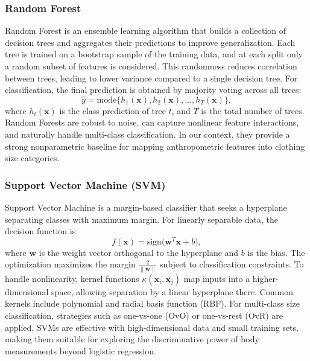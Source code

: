 \documentclass{llncs}
\begin{document}
\subsubsection{Random Forest}
Random Forest \cite{ref18} is an ensemble learning algorithm that builds a collection of decision trees and aggregates their predictions to improve generalization. Each tree is trained on a bootstrap sample of the training data, and at each split only a random subset of features is considered. This randomness reduces correlation between trees, leading to lower variance compared to a single decision tree. For classification, the final prediction is obtained by majority voting across all trees:
\begin{equation}
\hat{y} = \mathrm{mode}\{h_{1}(\mathbf{x}), h_{2}(\mathbf{x}), \ldots, h_{T}(\mathbf{x})\},
\end{equation}
where $h_{t}(\mathbf{x})$ is the class prediction of tree $t$, and $T$ is the total number of trees. Random Forests are robust to noise, can capture nonlinear feature interactions, and naturally handle multi-class classification. In our context, they provide a strong nonparametric baseline for mapping anthropometric features into clothing size categories.

\subsubsection{Support Vector Machine (SVM)}
Support Vector Machine \cite{ref19} is a margin-based classifier that seeks a hyperplane separating classes with maximum margin. For linearly separable data, the decision function is
\begin{equation}
f(\mathbf{x}) = \mathrm{sign}\big(\mathbf{w}^{T}\mathbf{x} + b\big),
\end{equation}
where $\mathbf{w}$ is the weight vector orthogonal to the hyperplane and $b$ is the bias. The optimization maximizes the margin $\frac{2}{\|\mathbf{w}\|}$ subject to classification constraints. To handle nonlinearity, kernel functions $\kappa(\mathbf{x}_{i},\mathbf{x}_{j})$ map inputs into a higher-dimensional space, allowing separation by a linear hyperplane there. Common kernels include polynomial and radial basis function (RBF). For multi-class size classification, strategies such as one-vs-one (OvO) or one-vs-rest (OvR) are applied. SVMs are effective with high-dimensional data and small training sets, making them suitable for exploring the discriminative power of body measurements beyond logistic regression.
\end{document}
